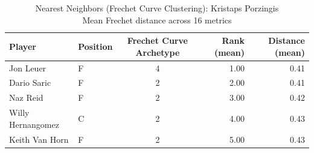 \begin{table}[t]
\caption*{
{\fontsize{20}{25} Nearest Neighbors (Frechet Curve Clustering): Kristaps Porzingis\fontsize{12}{15}\selectfont } \\ 
{\fontsize{14}{17}\selectfont  Mean Frechet distance across 16 metrics\fontsize{12}{15}\selectfont }
} 
\fontsize{12.0pt}{14.0pt}\selectfont
\begin{tabular*}{\linewidth}{@{\extracolsep{\fill}}llcrr}
\toprule
Player & Position & Frechet Curve Archetype & Rank (mean) & Distance (mean) \\ 
\midrule\addlinespace[2.5pt]
Jon Leuer & F & 4 & 1.00 & 0.41 \\ 
Dario Saric & F & 2 & 2.00 & 0.41 \\ 
Naz Reid & F & 2 & 3.00 & 0.42 \\ 
Willy Hernangomez & C & 2 & 4.00 & 0.43 \\ 
Keith Van Horn & F & 2 & 5.00 & 0.43 \\ 
\bottomrule
\end{tabular*}
\end{table}


